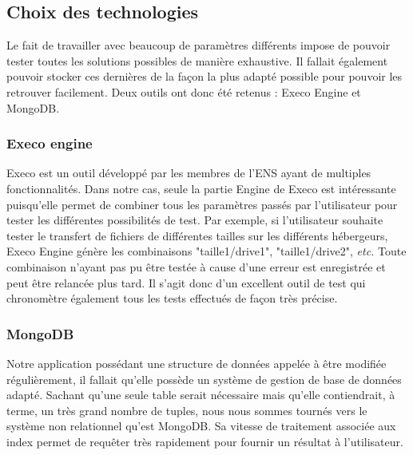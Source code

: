 \documentclass[10pt]{article}
\begin{document}
\subsection{Choix des technologies}

Le fait de travailler avec beaucoup de paramètres différents impose de
pouvoir tester toutes les solutions possibles de manière
exhaustive. Il fallait également pouvoir stocker ces dernières de la
façon la plus adapté possible pour pouvoir les retrouver
facilement. Deux outils ont donc été retenus : Execo Engine et MongoDB.

\subsubsection{Execo engine}

Execo est un outil développé par les membres de l'ENS ayant de
multiples fonctionnalités. Dans notre cas, seule la partie Engine de
Execo est intéressante puisqu'elle permet de combiner tous les
paramètres passés par l'utilisateur pour tester les différentes
possibilités de test. Par exemple, si l'utilisateur souhaite tester le
transfert de fichiers de différentes tailles sur les différents
hébergeurs, Execo Engine génère les combinaisons "taille1/drive1",
"taille1/drive2", \textit{etc.} Toute combinaison n'ayant pas pu être testée
à cause d'une erreur est enregistrée et peut être relancée plus
tard. Il s'agit donc d'un excellent outil de test qui chronomètre
également tous les tests effectués de façon très précise.

\subsubsection{MongoDB}

Notre application possédant une structure de données appelée à être
modifiée régulièrement, il fallait qu'elle possède un système de
gestion de base de données adapté. Sachant qu'une seule table serait
nécessaire mais qu'elle contiendrait, à terme, un très grand nombre de
tuples, nous nous sommes tournés vers le système non relationnel
qu'est MongoDB. Sa vitesse de traitement associée aux index permet de
requêter très rapidement pour fournir un résultat à l'utilisateur.
\end{document}
